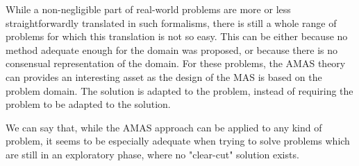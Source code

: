 While a non-negligible part of real-world problems are more or less straightforwardly translated in such formalisms, there is still a whole range of problems for which this translation is not so easy. This can be either because no method adequate enough for the domain was proposed, or because there is no consensual representation of the domain. For these problems, the AMAS theory can provides an interesting asset as the design of the MAS is based on the problem domain. The solution is adapted to the problem, instead of requiring the problem to be adapted to the solution.

We can say that, while the AMAS approach can be applied to any kind of problem, it seems to be especially adequate when trying to solve problems which are still in an exploratory phase, where no "clear-cut" solution exists.


